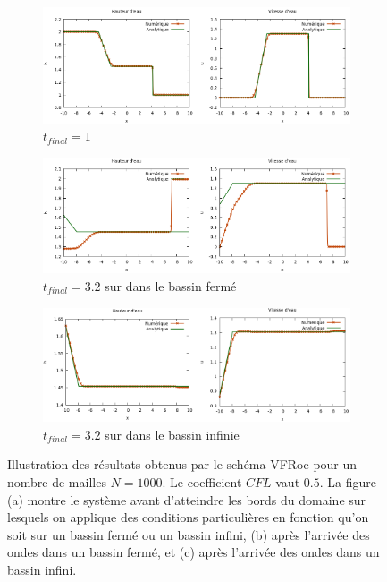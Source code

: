 \documentclass[
	french,
	11pt, %
]{fphw}
\begin{document}
\begin{figure}[H]
	\centering
	\begin{subfigure}[b]{0.8\textwidth}
		\centering
		\includegraphics[width=\textwidth]{VFRoeNormal.png}
		\caption{$t_{final}=1$}
	\end{subfigure}
	\begin{subfigure}[b]{0.8\textwidth}
		\centering
		\includegraphics[width=\textwidth]{VFRoeBorne.png}
		\caption{$t_{final}=3.2$ sur dans le bassin fermé}
	\end{subfigure}
	\begin{subfigure}[b]{0.8\textwidth}
		\centering
		\includegraphics[width=\textwidth]{VFRoeInfinie.png}
		\caption{$t_{final}=3.2$ sur dans le bassin infinie}
	\end{subfigure}
	\caption{Illustration des résultats obtenus par le schéma VFRoe pour un nombre de mailles $N=1000$. Le coefficient $CFL$ vaut $0.5$. La figure (a) montre le système avant d'atteindre les bords du domaine sur lesquels on applique des conditions particulières en fonction qu'on soit sur un bassin fermé ou un bassin infini, (b) après l'arrivée des ondes dans un bassin fermé, et (c) après l'arrivée des ondes dans un bassin infini.}
	\label{fig:VFRoeNormal}
\end{figure}
\end{document}
